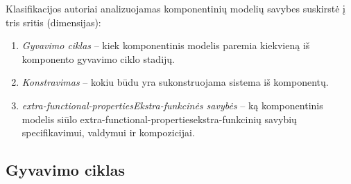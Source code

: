 Klasifikacijos autoriai analizuojamas komponentinių modelių savybes
suskirstė į tris sritis (dimensijas):
\begin{enumerate}
  \item \emph{Gyvavimo ciklas} – kiek komponentinis modelis paremia
    kiekvieną iš komponento gyvavimo ciklo stadijų.
  \item \emph{Konstravimas} – kokiu būdu yra sukonstruojama sistema iš
    komponentų.
  \item \emph{\gls{extra-functional-properties}{Ekstra-funkcinės savybės}}
    – ką komponentinis modelis siūlo
    \gls{extra-functional-properties}{ekstra-funkcinių savybių}
    specifikavimui, valdymui ir kompozicijai.
\end{enumerate}

\subsection{Gyvavimo ciklas}

